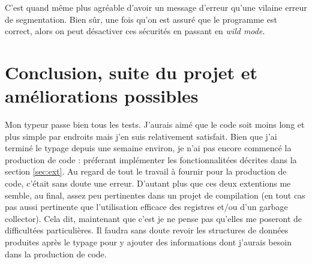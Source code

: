 \documentclass{article}
\begin{document}
C'est quand même plus agréable d'avoir un message d'erreur qu'une vilaine erreur de segmentation. Bien sûr, une fois qu'on est assuré que le programme est correct, alors on peut désactiver ces sécurités en passant en \textit{wild mode}.

\section{Conclusion, suite du projet et améliorations possibles}

Mon typeur passe bien tous les tests. J'aurais aimé que le code soit moins long et plus simple par endroits mais j'en suis relativement satisfait. Bien que j'ai terminé le typage depuis une semaine environ, je n'ai pas encore commencé la production de code : préferant implémenter les fonctionnalitées décrites dans la section \ref{sec:ext}. Au regard de tout le travail à fournir pour la production de code, c'était sans doute une erreur. D'autant plus que ces deux extentions me semble, au final, assez peu pertinentes dans un projet de compilation (en tout cas pas aussi pertinente que l'utilisation efficace des registres et/ou d'un garbage collector). Cela dit, maintenant que c'est je ne pense pas qu'elles me poseront de difficultées particulières. Il faudra sans doute revoir les structures de données produites après le typage pour y ajouter des informations dont j'aurais besoin dans la production de code.
\end{document}
